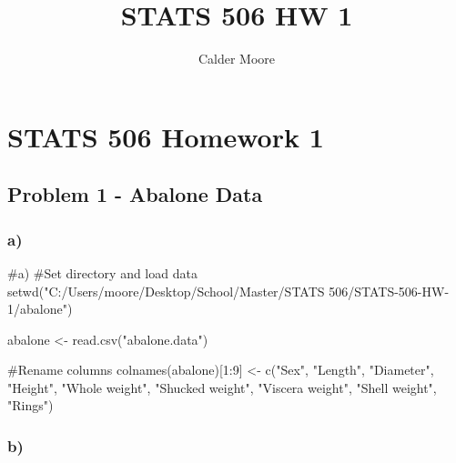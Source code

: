 \documentclass[
  letterpaper,
  DIV=11,
  numbers=noendperiod]{scrartcl}
\title{STATS 506 HW 1}
\author{Calder Moore}
\date{}
\newenvironment{Shaded}{\begin{snugshade}}{\end{snugshade}}
\newcommand{\CommentTok}[1]{\textcolor[rgb]{0.37,0.37,0.37}{#1}}
\newcommand{\DecValTok}[1]{\textcolor[rgb]{0.68,0.00,0.00}{#1}}
\newcommand{\FunctionTok}[1]{\textcolor[rgb]{0.28,0.35,0.67}{#1}}
\newcommand{\NormalTok}[1]{\textcolor[rgb]{0.00,0.23,0.31}{#1}}
\newcommand{\OtherTok}[1]{\textcolor[rgb]{0.00,0.23,0.31}{#1}}
\newcommand{\SpecialCharTok}[1]{\textcolor[rgb]{0.37,0.37,0.37}{#1}}
\newcommand{\StringTok}[1]{\textcolor[rgb]{0.13,0.47,0.30}{#1}}
\begin{document}
\maketitle


\section{STATS 506 Homework 1}\label{stats-506-homework-1}

\subsection{Problem 1 - Abalone Data}\label{problem-1---abalone-data}

\subsubsection{a)}\label{a}

\begin{Shaded}
\begin{Highlighting}[]
\CommentTok{\#a)}
\CommentTok{\#Set directory and load data}
\FunctionTok{setwd}\NormalTok{(}\StringTok{"C:/Users/moore/Desktop/School/Master/STATS 506/STATS{-}506{-}HW{-}1/abalone"}\NormalTok{)}

\NormalTok{abalone }\OtherTok{\textless{}{-}} \FunctionTok{read.csv}\NormalTok{(}\StringTok{"abalone.data"}\NormalTok{)}

\CommentTok{\#Rename columns}
\FunctionTok{colnames}\NormalTok{(abalone)[}\DecValTok{1}\SpecialCharTok{:}\DecValTok{9}\NormalTok{] }\OtherTok{\textless{}{-}} \FunctionTok{c}\NormalTok{(}\StringTok{"Sex"}\NormalTok{, }\StringTok{"Length"}\NormalTok{, }\StringTok{"Diameter"}\NormalTok{, }\StringTok{"Height"}\NormalTok{, }\StringTok{"Whole weight"}\NormalTok{, }\StringTok{"Shucked weight"}\NormalTok{, }\StringTok{"Viscera weight"}\NormalTok{, }\StringTok{"Shell weight"}\NormalTok{, }\StringTok{"Rings"}\NormalTok{)}
\end{Highlighting}
\end{Shaded}

\subsubsection{b)}\label{b}

\begin{Shaded}
\end{Shaded}
\end{document}
